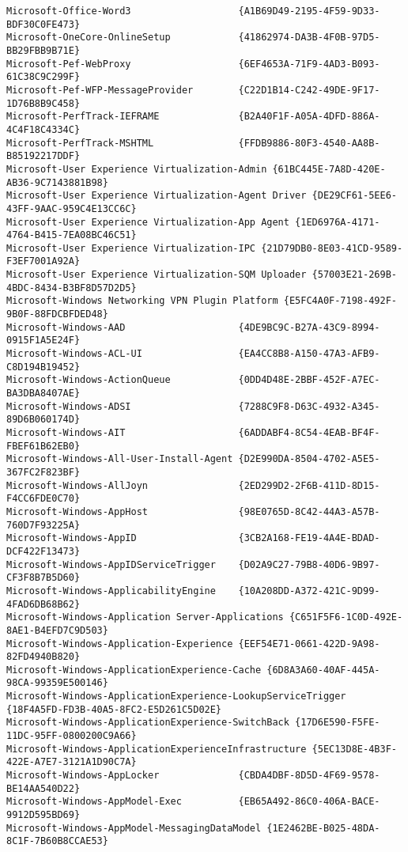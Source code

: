 \documentclass{report}
\begin{document}
\begin{lstlisting}[breaklines=true,basicstyle=\tiny]
Microsoft-Office-Word3                   {A1B69D49-2195-4F59-9D33-BDF30C0FE473}
Microsoft-OneCore-OnlineSetup            {41862974-DA3B-4F0B-97D5-BB29FBB9B71E}
Microsoft-Pef-WebProxy                   {6EF4653A-71F9-4AD3-B093-61C38C9C299F}
Microsoft-Pef-WFP-MessageProvider        {C22D1B14-C242-49DE-9F17-1D76B8B9C458}
Microsoft-PerfTrack-IEFRAME              {B2A40F1F-A05A-4DFD-886A-4C4F18C4334C}
Microsoft-PerfTrack-MSHTML               {FFDB9886-80F3-4540-AA8B-B85192217DDF}
Microsoft-User Experience Virtualization-Admin {61BC445E-7A8D-420E-AB36-9C7143881B98}
Microsoft-User Experience Virtualization-Agent Driver {DE29CF61-5EE6-43FF-9AAC-959C4E13CC6C}
Microsoft-User Experience Virtualization-App Agent {1ED6976A-4171-4764-B415-7EA08BC46C51}
Microsoft-User Experience Virtualization-IPC {21D79DB0-8E03-41CD-9589-F3EF7001A92A}
Microsoft-User Experience Virtualization-SQM Uploader {57003E21-269B-4BDC-8434-B3BF8D57D2D5}
Microsoft-Windows Networking VPN Plugin Platform {E5FC4A0F-7198-492F-9B0F-88FDCBFDED48}
Microsoft-Windows-AAD                    {4DE9BC9C-B27A-43C9-8994-0915F1A5E24F}
Microsoft-Windows-ACL-UI                 {EA4CC8B8-A150-47A3-AFB9-C8D194B19452}
Microsoft-Windows-ActionQueue            {0DD4D48E-2BBF-452F-A7EC-BA3DBA8407AE}
Microsoft-Windows-ADSI                   {7288C9F8-D63C-4932-A345-89D6B060174D}
Microsoft-Windows-AIT                    {6ADDABF4-8C54-4EAB-BF4F-FBEF61B62EB0}
Microsoft-Windows-All-User-Install-Agent {D2E990DA-8504-4702-A5E5-367FC2F823BF}
Microsoft-Windows-AllJoyn                {2ED299D2-2F6B-411D-8D15-F4CC6FDE0C70}
Microsoft-Windows-AppHost                {98E0765D-8C42-44A3-A57B-760D7F93225A}
Microsoft-Windows-AppID                  {3CB2A168-FE19-4A4E-BDAD-DCF422F13473}
Microsoft-Windows-AppIDServiceTrigger    {D02A9C27-79B8-40D6-9B97-CF3F8B7B5D60}
Microsoft-Windows-ApplicabilityEngine    {10A208DD-A372-421C-9D99-4FAD6DB68B62}
Microsoft-Windows-Application Server-Applications {C651F5F6-1C0D-492E-8AE1-B4EFD7C9D503}
Microsoft-Windows-Application-Experience {EEF54E71-0661-422D-9A98-82FD4940B820}
Microsoft-Windows-ApplicationExperience-Cache {6D8A3A60-40AF-445A-98CA-99359E500146}
Microsoft-Windows-ApplicationExperience-LookupServiceTrigger {18F4A5FD-FD3B-40A5-8FC2-E5D261C5D02E}
Microsoft-Windows-ApplicationExperience-SwitchBack {17D6E590-F5FE-11DC-95FF-0800200C9A66}
Microsoft-Windows-ApplicationExperienceInfrastructure {5EC13D8E-4B3F-422E-A7E7-3121A1D90C7A}
Microsoft-Windows-AppLocker              {CBDA4DBF-8D5D-4F69-9578-BE14AA540D22}
Microsoft-Windows-AppModel-Exec          {EB65A492-86C0-406A-BACE-9912D595BD69}
Microsoft-Windows-AppModel-MessagingDataModel {1E2462BE-B025-48DA-8C1F-7B60B8CCAE53}

\end{lstlisting}
\end{document}
